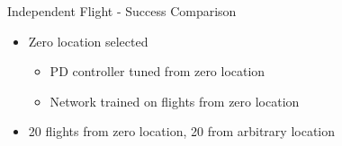 \documentclass[xcolor=x11names,compress]{beamer}
\begin{document}
\begin{frame}{Independent Flight - Success Comparison}
	\begin{itemize}
		\item Zero location selected
        \begin{itemize}
            \item PD controller tuned from zero location
            \item Network trained on flights from zero location
        \end{itemize}
        \item 20 flights from zero location, 20 from arbitrary location
        
	\end{itemize}

\begin{table}[]
\end{table}



\end{frame}
\end{document}
